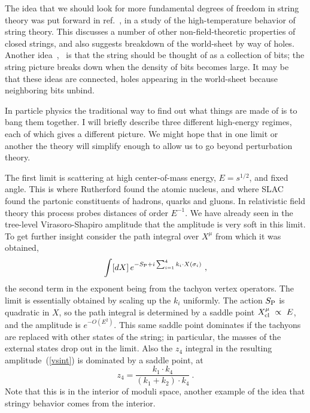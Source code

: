 The idea that we should look for more fundamental degrees of freedom
in string theory was put forward in ref.~\cite{AtW}, in a study
of the high-temperature behavior of string theory.
This discusses a number of other non-field-theoretic properties of
closed strings, and also suggests breakdown of the world-sheet by way
of holes.  Another idea~\cite{Tbit},~\cite{Sbit} is that 
the string should be thought of as a
collection of bits; the string picture breaks down when the
density of bits becomes large.  It may be that these ideas are
connected, holes appearing in the world-sheet because neighboring bits
unbind.


In particle physics the traditional way to find out what things are
made of is to bang them together.  I will briefly describe three
different high-energy regimes, each of which gives a different
picture.  We might hope that in one limit or another the theory will
simplify enough to allow us to go beyond perturbation theory.

The first limit is scattering at high center-of-mass energy, $E =
s^{1/2}$, and fixed angle.  This is where Rutherford found the
atomic nucleus, and where SLAC found the partonic constituents of
hadrons, quarks and gluons.  In relativistic field theory this process
probes distances of order
$E^{-1}$.    We have already seen in the
tree-level Virasoro-Shapiro amplitude that the amplitude is very
soft in this limit.  To get further insight\cite{GM} consider
the path integral over $X^\mu$ from which it was obtained,
\begin{equation} \int [dX]\, e^{-S_{\rm P} + i \sum_{i=1}^4 k_i \cdot
X(\sigma_i)}\ ,
\end{equation}
the second term in the exponent being from the tachyon vertex
operators.  The limit is essentially
obtained by scaling up the $k_i$ uniformly.  The action $S_{\rm P}$ is
quadratic in $X$, so the path integral is determined by a saddle point
$X^\mu_{\rm cl} \ \propto\ E$, and the amplitude is $e^{-O(E^2)}$.
This same saddle point dominates if the
tachyons are replaced with other states of the string; in particular,
the masses of the external states drop out in the limit.   Also the
$z_4$ integral in the resulting
amplitude~(\ref{vsint}) is dominated by a saddle point, at
\begin{equation}
z_4 = \frac{k_1 \cdot k_4}{(k_1 + k_2)\cdot k_4}\ .
\end{equation}
Note that this is in the interior of moduli space, another example
of the idea that stringy behavior comes from the interior.

